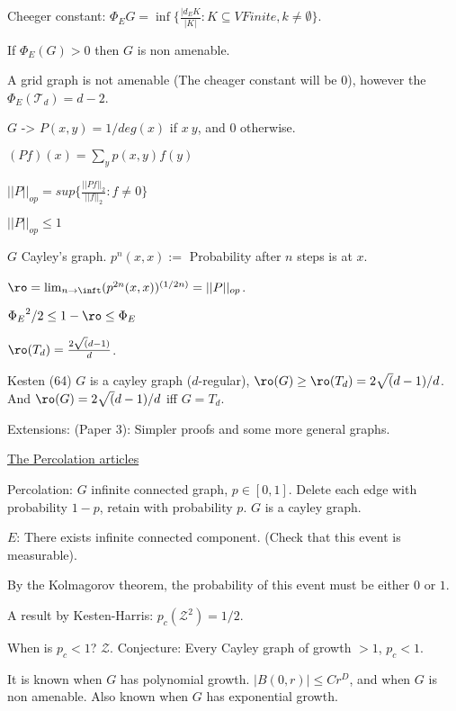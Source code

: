 Cheeger constant:
${\Phi}_E{G} = \inf \{ \frac{|d_E{K}}{|K|} : K \subseteq V Finite, k \neq
\emptyset\}$.

If ${\Phi}_E(G) > 0$ then $G$ is non amenable.

A grid graph is not amenable (The cheager constant will be $0$), however the
${\Phi}_E(\mathcal{T}_d) = d-2$.


$G$ ->  $P(x,y) = 1/deg(x)$ if $x~y$, and $0$ otherwise.

$(Pf)(x) = {\sum}_y p(x,y)f(y)$

$||P||_{op} = sup \{ \frac{||Pf||_2}{||f||_2} : f \neq 0\}$

$||P||_{op} \leq 1$


\begin{prop}
$G$ Cayley's graph.
$p^n(x,x) := $ Probability after $n$ steps is at $x$.

$\ro = {\lim}_{n \rightarrow \inft} (p^{2n}(x,x))^{(1/2n)} = ||P||_{op}$.
\end{prop}

\begin{thm}
  ${{{\Phi}_E}^2}/2 \leq 1 - \ro \leq {\Phi}_E$

\end{thm}

$\ro(T_d) = \frac{2\sqrt(d-1)}{d}$.

\begin{thm}
  Kesten (64)
  $G$ is a cayley graph ($d$-regular), $\ro(G) \geq \ro(T_d) = 2\sqrt(d-1)/d$.
  And $\ro(G) = 2\sqrt(d-1)/d$ iff $G=T_d$.

\end{thm}

Extensions: (Paper 3): Simpler proofs and some more general graphs.


\uline{The Percolation articles}

Percolation: $G$ infinite connected graph, $p \in [0,1]$.
Delete each edge with probability $1-p$, retain with probability $p$.
$G$ is a cayley graph.

$E$: There exists infinite connected component. (Check that this event is
measurable).

By the Kolmagorov theorem, the probability of this event must be either $0$ or
$1$.

A result by Kesten-Harris: $p_c(\mathcal{Z}^2) = 1/2$.


When is $p_c < 1$? $\mathcal{Z}$.
Conjecture: Every Cayley graph of growth $>1$, $p_c < 1$.

It is known when $G$ has polynomial growth. $|B(0,r)| \leq Cr^D$, and when $G$
is non amenable. Also known when $G$ has exponential growth.
